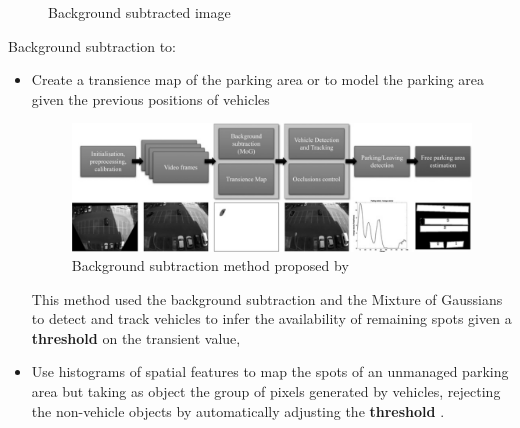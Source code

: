 \documentclass{beamer}
\begin{document}
\begin{frame}[allowframebreaks]
\begin{figure}[!htbp]
\begin{minipage}[b]{0.48\textwidth}
		\caption{Background subtracted image}
		\label{background}
	\end{minipage}
\end{figure}
\vspace{5cm}
Background subtraction to:
\begin{itemize}
	\item Create a transience map of the parking area or to model the parking area given the previous positions of vehicles \cite{Postigo}
	\begin{figure}
		\includegraphics[width=300pt]{Pictures/transmap}
		\caption{Background subtraction method proposed by \cite{Postigo}}
		\label{postigo}
	\end{figure}
	This method used the background subtraction and the Mixture of Gaussians to detect and track vehicles to infer the availability of remaining spots given a \textbf{threshold} on the transient value, 
	\item Use histograms of spatial features to map the spots of an unmanaged parking area but taking as object the group of pixels generated by vehicles, rejecting the non-vehicle objects by automatically adjusting the \textbf{threshold} \cite{Choeychuen}.
\end{itemize}


\end{frame}
\end{document}
